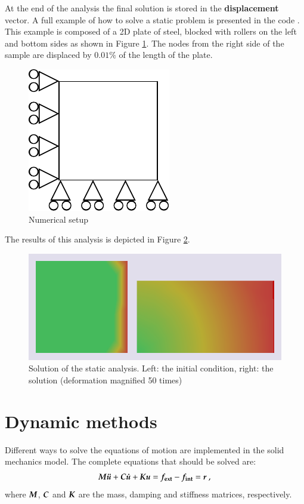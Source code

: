 At   the  end   of  the   analysis  the   final  solution   is  stored   in  the
\textbf{displacement} vector.  A  full example of how to  solve a static problem
is  presented  in   the  code  .   This
example is composed of a 2D plate of steel, blocked with rollers on the left and
bottom sides as shown in  Figure \ref{fig:smm:static}.  The nodes from the right
side of the sample are displaced by $0.01\%$ of the length of the plate.

\begin{figure}[!htb]
  \centering
  \includegraphics{figures/static}
  \caption{Numerical setup\label{fig:smm:static}}
\end{figure}

The     results     of    this     analysis     is     depicted    in     Figure
\ref{fig:smm:implicit:static_solution}.

\begin{figure}[!htb]
  \centering
  \includegraphics[width=.6\linewidth]{figures/static_analysis}
  \caption{Solution of the static  analysis. Left: the initial condition, right:
    the solution (deformation magnified 50 times)}
  \label{fig:smm:implicit:static_solution}
\end{figure}

\section{Dynamic methods} \label{sect:smm:Dynamic_methods}

Different ways  to solve  the equations  of motion are  implemented in  the solid
mechanics model.  The complete equations that should be solved are:
\begin{equation}\label{eqn:equation-motion}
  \boldsymbol{M}\boldsymbol{\ddot{u}}     +    \boldsymbol{C}\boldsymbol{\dot{u}}    +     \boldsymbol{K}\boldsymbol{u}    =
  \boldsymbol{f_{{\mathrm{ext}}}} - \boldsymbol{f_{{\mathrm{int}}}} = \boldsymbol{r}~,
\end{equation}
where $\boldsymbol{M}$,  $\boldsymbol{C}$ and  $\boldsymbol{K}$ are the  mass, damping  and stiffness
matrices, respectively.

